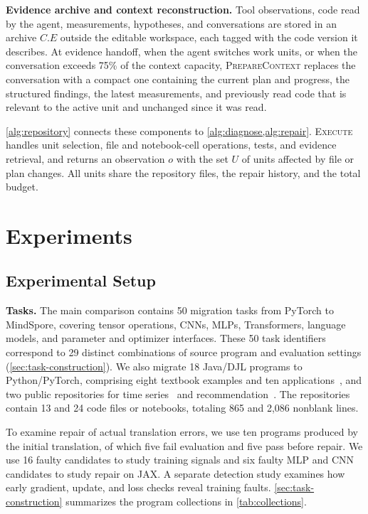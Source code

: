 \documentclass{article}
\begin{document}
\textbf{Evidence archive and context reconstruction.} Tool observations, code read by the agent, measurements, hypotheses, and conversations are stored in an archive $C.E$ outside the editable workspace, each tagged with the code version it describes. At evidence handoff, when the agent switches work units, or when the conversation exceeds 75\% of the context capacity, \textsc{PrepareContext} replaces the conversation with a compact one containing the current plan and progress, the structured findings, the latest measurements, and previously read code that is relevant to the active unit and unchanged since it was read.

\cref{alg:repository} connects these components to \cref{alg:diagnose,alg:repair}. \textsc{Execute} handles unit selection, file and notebook-cell operations, tests, and evidence retrieval, and returns an observation $o$ with the set $U$ of units affected by file or plan changes. All units share the repository files, the repair history, and the total budget.



\section{Experiments}

\subsection{Experimental Setup}
\label{sec:setup}

\textbf{Tasks.} The main comparison contains 50 migration tasks from PyTorch to MindSpore, covering tensor operations, CNNs, MLPs, Transformers, language models, and parameter and optimizer interfaces. These 50 task identifiers correspond to 29 distinct combinations of source program and evaluation settings (\cref{sec:task-construction}). We also migrate 18 Java/DJL programs to Python/PyTorch, comprising eight textbook examples and ten applications~\citep{djl2026,d2ljava2026}, and two public repositories for time series~\citep{jingles2026timeseries} and recommendation~\citep{chak2026twotower}. The repositories contain 13 and 24 code files or notebooks, totaling 865 and 2,086 nonblank lines.

To examine repair of actual translation errors, we use ten programs produced by the initial translation, of which five fail evaluation and five pass before repair. We use 16 faulty candidates to study training signals and six faulty MLP and CNN candidates to study repair on JAX. A separate detection study examines how early gradient, update, and loss checks reveal training faults. \cref{sec:task-construction} summarizes the program collections in \cref{tab:collections}.
\end{document}
